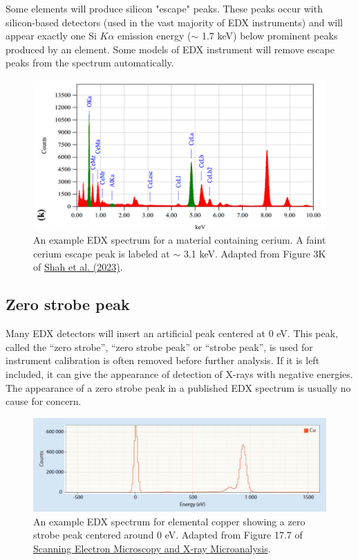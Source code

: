 \documentclass[letterpaper, 12pt]{article}
\begin{document}
Some elements will produce silicon "escape" peaks. These peaks occur with silicon-based detectors (used in the vast majority of EDX instruments) and will appear exactly one Si $K\alpha$ emission energy ($\sim$ 1.7 keV) below prominent peaks produced by an element. Some models of EDX instrument will remove escape peaks from the spectrum automatically.

\begin{figure}[h!tbp]
    \includegraphics[width=\textwidth]{img/edx/shah_edx.png}
    \caption*{ An example EDX spectrum for a material containing cerium. A faint cerium escape peak is labeled at $\sim$ 3.1 keV. Adapted from Figure 3K of \href{https://doi.org/10.1016/j.ijhydene.2022.12.153}{Shah et al. (2023)}.}
\end{figure}

\subsection*{Zero strobe peak}

Many EDX detectors will insert an artificial peak centered at 0 eV. This peak, called the ``zero strobe'', ``zero strobe peak'' or ``strobe peak'', is used for instrument calibration is often removed before further analysis. If it is left included, it can give the appearance of detection of X-rays with negative energies. The appearance of a zero strobe peak in a published EDX spectrum is usually no cause for concern.

\begin{figure}[h!tbp]
    \includegraphics[width=\textwidth]{img/edx/zero_strobe_peak.png}
    \caption*{ An example EDX spectrum for elemental copper showing a zero strobe peak centered around 0 eV. Adapted from Figure 17.7 of \href{https://doi.org/10.1007/978-1-4939-6676-9}{Scanning Electron Microscopy and X-ray Microanalysis}.}
\end{figure}
\end{document}
